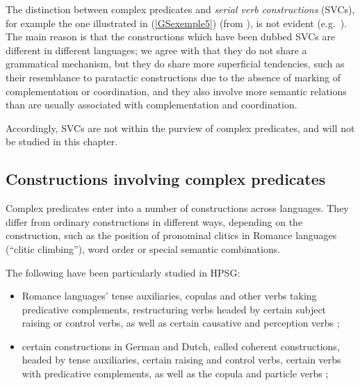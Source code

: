 {The distinction between complex predicates and \emph{serial verb constructions} (SVCs), for example the one illustrated in (\ref{GSexemple5}) (from \citealt[294]{MH2016}), is not evident (e.g.\ \citealt{andrews1999complex, MH2016}). The main reason is that the constructions which have been dubbed SVCs are different in different languages; we agree with \cite{andrews1999complex} that they do not share a grammatical mechanism, but they do share more superficial tendencies, such as their resemblance to paratactic constructions due to the absence of marking of complementation or coordination, and they also involve more semantic relations than are usually associated with complementation and coordination.

\z

Accordingly, SVCs are not within the purview of complex predicates, and will not be studied in this chapter.

\subsection{Constructions involving complex predicates}\label{GSsection1.2}

Complex predicates enter into a number of constructions across languages. They differ from ordinary constructions in different ways, depending on the construction, such as the position of pronominal clitics in Romance languages (``clitic climbing''), word order or special semantic combinations. 

The following have been particularly studied in HPSG:

\begin{itemize}
	
	\item Romance languages' tense auxiliaries, copulas and other verbs taking predicative complements, restructuring verbs headed by certain subject raising or control verbs, as well as certain causative and perception verbs \citep{abeille1994complementation, abeille2000french, abeille2001deux, abeille2001varieties, AG2002b-u, AG2010, abeille1995doublestructure, AGMS98a, AGS1998, Monachesi98a};
	
	\item certain constructions in German and Dutch, called coherent constructions, headed by tense auxiliaries, certain raising and control verbs, certain verbs with predicative complements, as well as the copula and particle verbs \citep{HN89b, HN94a, Rentier94, Kiss94, Kiss95a, BvN98a, HN98a, Kathol98b, Kathol2000a, Meurers2000b-Short, DM2002, dKM2001a,  Mueller2002b, Mueller2003a, muller2018clause};
	

\end{itemize}}
